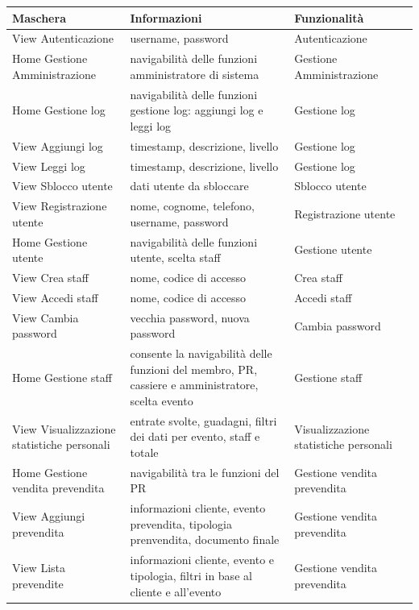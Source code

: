 \documentclass[a4paper]{article}
\begin{document}
\begin{center}
    \begin{tabularx}{1\textwidth}{|X|X|X|X|}
    \hline
    \textbf{Maschera} & \textbf{Informazioni} & \textbf{Funzionalità}\\
    \hline
    \hline
    View Autenticazione & username, password & Autenticazione\\
    \hline
    Home Gestione Amministrazione & navigabilità delle funzioni amministratore di sistema & Gestione Amministrazione\\
    \hline
    Home Gestione log & navigabilità delle funzioni gestione log: aggiungi log e leggi log & Gestione log\\
    \hline
    View Aggiungi log & timestamp, descrizione, livello & Gestione log\\
    \hline
    View Leggi log & timestamp, descrizione, livello & Gestione log\\
    \hline
    View Sblocco utente & dati utente da sbloccare & Sblocco utente \\
    \hline
    View Registrazione utente & nome, cognome, telefono, username, password & Registrazione utente\\
    \hline
    Home Gestione utente & navigabilità delle funzioni utente, scelta staff & Gestione utente\\
    \hline
    View Crea staff & nome, codice di accesso & Crea staff\\
    \hline
    View Accedi staff & nome, codice di accesso & Accedi staff\\
    \hline
    View Cambia password & vecchia password, nuova password & Cambia password\\
    \hline
    Home Gestione staff & consente la navigabilità delle funzioni del membro, PR, cassiere e amministratore, scelta evento & Gestione staff\\
    \hline
    View Visualizzazione statistiche personali & entrate svolte, guadagni, filtri dei dati per evento, staff e totale & Visualizzazione statistiche personali\\
    \hline
    Home Gestione vendita prevendita & navigabilità tra le funzioni del PR & Gestione vendita prevendita\\
    \hline
    View Aggiungi prevendita & informazioni cliente, evento prevendita, tipologia prenvendita, documento finale & Gestione vendita prevendita\\
    \hline
    View Lista prevendite & informazioni cliente, evento e tipologia, filtri in base al cliente e all'evento & Gestione vendita prevendita\\

\end{tabularx}
\end{center}
\end{document}
